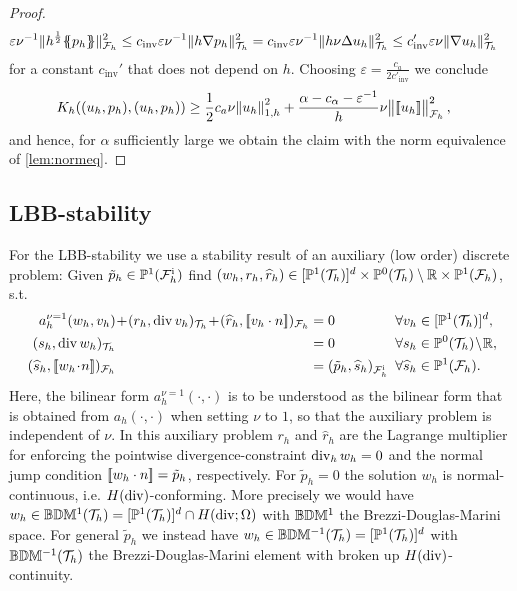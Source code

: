 \documentclass[sn-mathphys,Numbered]{sn-jnl}%
\renewcommand{\hat}[1]{\widehat{#1}}
\theoremstyle{remark}%
\theoremstyle{definition}%
\begin{document}
\begin{proof}
\begin{align*}
    \varepsilon \nu^{-1} \Vert h^{\frac12} \{\!\!\{ p_h\}\!\!\} \Vert_{{\mathcal{F}_h}}^2  &\leq c_{\text{inv}} \varepsilon \nu^{-1} \Vert  h \nabla p_h \Vert_{{\mathcal{T}_h}}^2 = c_{\text{inv}} \varepsilon \nu^{-1}  \Vert  h \nu \Delta u_h \Vert_{{\mathcal{T}_h}}^2 \leq c_{\text{inv}}' \varepsilon \nu \Vert \nabla u_h \Vert_{{\mathcal{T}_h}}^2
  \end{align*} 
  for a constant $c_{\text{inv}}'$ that does not depend on $h$. Choosing $\varepsilon = \frac{c_a}{2 c'_{\text{inv}}}$ we conclude
  \begin{align*}
    K_h((u_h,p_h),(u_h,p_h)) & \geq \frac12 c_a \nu  \norm{u_h}_{1,h}^2 + \frac{\alpha - c_\alpha - \varepsilon^{-1}}{h} \nu \norm{[\![u_h]\!]}_{{\mathcal{F}_h}}^2,
  \end{align*}
  and hence, for $\alpha$ sufficiently large we obtain the claim with the norm equivalence of \cref{lem:normeq}.
\end{proof}

\subsection{LBB-stability}
For the LBB-stability we use a stability result of an auxiliary (low order) discrete problem: Given $\tilde{p}_h \in \mathbb{P}^1({\mathcal{F}_h^{\text{i}}})$ find $(w_h,r_h,\hat{r}_h) \in [\PP^{1}(\Th)]^d \times \PP^0(\Th) \setminus \RR \times \PP^1(\Fh) $, s.t.
\begin{subequations}\label{eq:aux}
\begin{align}
  a_{h}^{\nu = 1}(w_h,v_h) & \!+\! (r_h, \Div v_h)_{\Th} \!+\! (\hat{r}_h, \jmp{v_h \cdot n})_{\Fh}  &&
  \!\!\!\!\!\!= 0 &&\!\!\! \forall v_h \in [\PP^1(\Th)]^d, \label{eq:auxa}\\
  (s_h, \Div w_h)_{\Th} &&& \!\!\!\!\!\!= 0 &&\!\!\! \forall s_h \in \PP^0(\Th) \! \setminus \! \RR,\!\! \label{eq:auxb}\\
  (\hat{s}_h, \jmp{w_h \!\cdot\! n})_{\Fh} 
  &&& \!\!\!\!\!\! = (\tilde{p}_h, \hat{s}_h)_{\Fhi}   &&\!\!\! \forall \hat{s}_h \in  \PP^1(\Fh). \label{eq:auxc}
\end{align}
\end{subequations}
Here, the bilinear form $a_{h}^{\nu = 1}(\cdot,\cdot)$ is to be understood as the bilinear form that is obtained from $a_{h}(\cdot,\cdot)$ when setting $\nu$ to $1$, so that the auxiliary problem is independent of $\nu$. In this auxiliary problem $r_h$ and $\hat{r}_h$ are the Lagrange multiplier for enforcing the pointwise divergence-constraint $\operatorname{\mathrm{div}}_h w_h=0$ and the normal jump condition $[\![w_h \cdot n]\!] = \tilde{p}_h$, respectively.
For $\tilde{p}_h = 0$ the solution $w_h$ is normal-continuous, i.e. $H(\operatorname{\mathrm{div}})$-conforming. More precisely we would have $w_h \in \mathbb{B}\mathbb{D}\mathbb{M}^{1}({\mathcal{T}_h}) = [\mathbb{P}^1({\mathcal{T}_h})]^d \cap H(\operatorname{\mathrm{div}};\Omega)$ with $\mathbb{B}\mathbb{D}\mathbb{M}^{1}$ the Brezzi-Douglas-Marini space. For general $\tilde{p}_h$ we instead have 
$w_h \in \mathbb{B}\mathbb{D}\mathbb{M}^{-1}({\mathcal{T}_h}) = [\mathbb{P}^1({\mathcal{T}_h})]^d$ with $\mathbb{B}\mathbb{D}\mathbb{M}^{-1}({\mathcal{T}_h})$ the Brezzi-Douglas-Marini element with broken up $H(\operatorname{\mathrm{div}})$-continuity.
\end{document}

